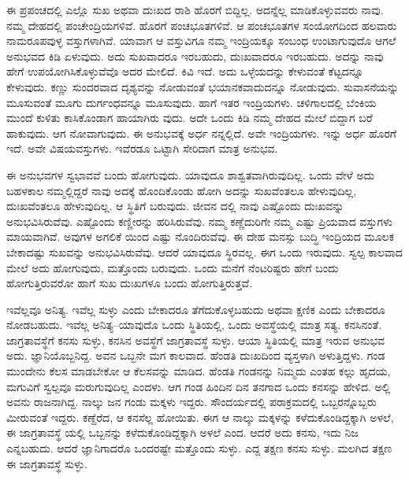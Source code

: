 ಈ ಪ್ರಪಂಚದಲ್ಲಿ ಎಲ್ಲೊ ಸುಖ ಅಥವಾ ದುಃಖದ ರಾಶಿ ಹೊರಗೆ ಬಿದ್ದಿಲ್ಲ. ಅದನ್ನೆಲ್ಲ ಮಾಡಿಕೊಳ್ಳುವವರು ನಾವು. ನಮ್ಮ ದೇಹದಲ್ಲಿ ಪಂಚೇಂದ್ರಿಯಗಳಿವೆ. ಹೊರಗೆ ಪಂಚಭೂತಗಳಿವೆ. ಆ ಪಂಚಭೂತಗಳ ಸಂಯೋಗದಿಂದ ಹಲವಾರು ನಾಮರೂಪವುಳ್ಳ ವಸ್ತುಗಳಾಗಿವೆ. ಯಾವಾಗ ಆ ವಸ್ತುವಿಗೂ ನಮ್ಮ ಇಂದ್ರಿಯಕ್ಕೂ ಸಂಬಂಧ ಉಂಟಾಗುವುದೊ ಆಗಲೆ ಅನುಭವದ ಕಿಡಿ ಏಳುವುದು. ಅದು ಸುಖವಾದರೂ ಇರಬಹುದು, ದುಃಖವಾದರೂ ಇರಬಹುದು. ಅದನ್ನು ನಾವು ಹೇಗೆ ಉಪಯೋಗಿಸಿಕೊಳ್ಳುವೆವೊ ಅದರ ಮೇಲಿದೆ. ಕಿವಿ ಇದೆ. ಅದು ಒಳ್ಳೆಯದನ್ನು ಕೇಳುವಂತೆ ಕೆಟ್ಟದನ್ನೂ ಕೇಳುವುದು. ಕಣ್ಣು ಸುಂದರವಾದ ದೃಶ್ಯವನ್ನು ನೋಡುವಂತೆ ಭಯಾನಕವಾದುದನ್ನೂ ನೋಡುವುದು. ಸುವಾಸನೆಯನ್ನು ಮೂಸುವಂತೆ ಮೂಗು ದುರ್ಗಂಧವನ್ನೂ ಮೂಸುವುದು. ಹಾಗೆ ಇತರ ಇಂದ್ರಿಯಗಳು. ಚಳಿಗಾಲದಲ್ಲಿ ಬೆಂಕಿಯ ಮುಂದೆ ಕುಳಿತು ಕಾಸಿಕೊಂಡಾಗ ಹಾಯಾಗಿರು ವುದು. ಅದೇ ಒಂದು ಕಿಡಿ ನಮ್ಮ ದೇಹದ ಮೇಲೆ ಬಿದ್ದಾಗ ಬರೆ ಹಾಕುವುದು. ಆಗ ನೋವಾಗುವುದು. ಈ ಅನುಭವಕ್ಕೆ ಅರ್ಧ ನನ್ನಲ್ಲಿದೆ. ಅವೇ ಇಂದ್ರಿಯಗಳು. ಇನ್ನು ಅರ್ಧ ಹೊರಗೆ ಇದೆ. ಅವೇ ವಿಷಯವಸ್ತುಗಳು. ಇವೆರಡೂ ಒಟ್ಟಾಗಿ ಸೇರಿದಾಗ ಮಾತ್ರ ಅನುಭವ.

ಈ ಅನುಭವಗಳ ಸ್ವಭಾವವೆ ಬಂದು ಹೋಗುವುದು. ಯಾವುದೂ ಶಾಶ್ವತವಾಗಿರುವುದಿಲ್ಲ. ಒಂದು ವೇಳೆ ಅದು ಬಹಳಕಾಲ ನಮ್ಮಲ್ಲಿದ್ದರೆ ನಾವು ಅದಕ್ಕೆ ಹೊಂದಿಕೊಂಡು ಹೋಗಿ ಅದನ್ನು ಸುಖವೆಂತಲೂ ಹೇಳುವುದಿಲ್ಲ, ದುಃಖವೆಂತಲೂ ಹೇಳುವುದಿಲ್ಲ. ಆ ಸ್ಥಿತಿಗೆ ಬರುವುದು. ಜೀವನ ದಲ್ಲಿ ನಾವು ಎಷ್ಟೊಂದು ದುಃಖವನ್ನು ಅನುಭವಿಸಿರುವೆವು. ಎಷ್ಟೊಂದು ಕಣ್ಣೀರನ್ನು ಹರಿಸಿರುವೆವು. ನಮ್ಮ ಕಣ್ಣೆದುರಿಗೇ ನಮ್ಮ ಎಷ್ಟು ಪ್ರಿಯವಾದ ವಸ್ತುಗಳು ಮಾಯವಾಗಿವೆ. ಅವುಗಳ ಅಗಲಿಕೆ ಯಿಂದ ಎಷ್ಟು ನೊಂದಿರುವೆವು. ಈ ದೇಹ ಮನಸ್ಸು ಬುದ್ಧಿ ಇಂದ್ರಿಯದ ಮೂಲಕ ಬೇಕಾದಷ್ಟು ಸುಖವನ್ನು ಅನುಭವಿಸಿರುವೆವು. ಆದರೆ ಯಾವುದೂ ಸ್ಥಿರವಲ್ಲ. ಈಗ ಒಂದು ಇರುವುದು. ಸ್ವಲ್ಪ ಕಾಲವಾದ ಮೇಲೆ ಅದು ಹೋಗುವುದು, ಮತ್ತೊಂದು ಬರುವುದು. ಒಂದು ಮನೆಗೆ ನೆಂಟರಿಷ್ಟರು ಹೇಗೆ ಬಂದು ಹೋಗುತ್ತಿರುವರೋ ಹಾಗೆ ಸುಖ ದುಃಖಗಳೂ ಬಂದು ಹೋಗುತ್ತಿರುತ್ತವೆ.

ಇವೆಲ್ಲವೂ ಅನಿತ್ಯ. ಇವೆಲ್ಲ ಸುಳ್ಳು ಎಂದು ಬೇಕಾದರೂ ತೆಗೆದುಕೊಳ್ಳಬಹುದು ಅಥವಾ ಕ್ಷಣಿಕ ಎಂದು ಬೇಕಾದರೂ ನೋಡಬಹುದು. ಇವೆಲ್ಲ ಅನಿತ್ಯ–ಯಾವುದೊ ಒಂದು ಸ್ಥಿತಿಯಲ್ಲಿ, ಒಂದು ಅವಸ್ಥೆಯಲ್ಲಿ ಮಾತ್ರ ಸತ್ಯ. ಕನಸಿನಂತೆ. ಜಾಗ್ರತಾವಸ್ಥೆಗೆ ಕನಸು ಸುಳ್ಳು, ಕನಸಿನ ಅವಸ್ಥೆಗೆ ಜಾಗ್ರತಾವಸ್ಥೆ ಸುಳ್ಳು. ಆಯಾ ಸ್ಥಿತಿಯಲ್ಲಿ ಮಾತ್ರ ಇರುವ ಅನುಭವ ಅದು. ಜ್ಞಾನಿಯೊಬ್ಬನಿದ್ದ. ಅವನ ಒಬ್ಬನೇ ಮಗ ಕಾಲವಾದ. ಹೆಂಡತಿ ದುಃಖದಿಂದ ವ್ಯಸ್ತಳಾಗಿ ಅಳುತ್ತಿದ್ದಳು. ಗಂಡ ಮುಂದೇನು ಕೆಲಸ ಮಾಡಬೇಕೋ ಆ ಕೆಲಸವನ್ನು ಮಾಡಿದ. ಹೆಂಡತಿ ಗಂಡನನ್ನು ನಿಮ್ಮದು ಎಂತಹ ಕಲ್ಲು ಹೃದಯ, ಮಗುವಿಗೆ ಸ್ವಲ್ಪವೂ ಮರುಗುವುದಿಲ್ಲ ಎಂದಳು. ಆಗ ಗಂಡ ಹಿಂದಿನ ದಿನ ತನಗಾದ ಒಂದು ಕನಸನ್ನು ಹೇಳಿದ. ಅಲ್ಲಿ ಅವನು ರಾಜನಾಗಿದ್ದ. ನಾಲ್ಕು ಜನ ಗಂಡು ಮಕ್ಕಳು ಇದ್ದರು. ಸೌಂದರ್ಯದಲ್ಲಿ ಪರಾಕ್ರಮದಲ್ಲಿ ಒಬ್ಬರನ್ನೊಬ್ಬರು ಮೀರುವಂತೆ ಇದ್ದರು. ಕಣ್ದೆರೆದ, ಆ ಕನಸೆಲ್ಲ ಹೋಯಿತು. ಈಗ ಆ ನಾಲ್ಕು ಮಕ್ಕಳನ್ನು ಕಳೆದುಕೊಂಡಿದ್ದಕ್ಕಾಗಿ ಅಳಲೆ, ಈ ಜಾಗ್ರತಾವಸ್ಥೆ ಯಲ್ಲಿ ಒಬ್ಬನನ್ನು ಕಳೆದುಕೊಂಡಿದ್ದಕ್ಕಾಗಿ ಅಳಲೆ ಎಂದ. ಆದರೆ ಅದು ಕನಸು, ಇದು ನಿಜ ಎನ್ನಬಹುದು. ಆದರೆ ಜ್ಞಾನಿಗಾದರೊ ಒಂದರಷ್ಟೇ ಮತ್ತೊಂದು ಸುಳ್ಳು. ಎದ್ದ ತಕ್ಷಣ ಕನಸು ಸುಳ್ಳು. ಮಲಗಿದ ತಕ್ಷಣ ಈ ಜಾಗ್ರತಾವಸ್ಥೆ ಸುಳ್ಳು.


